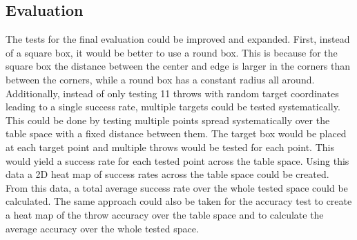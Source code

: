 \subsection{Evaluation}
The tests for the final evaluation could be improved and expanded. First, instead of a square box, it would be better to use a round box. This is because for the square box the distance between the center and edge is larger in the corners than between the corners, while a round box has a constant radius all around. Additionally, instead of only testing 11 throws with random target coordinates leading to a single success rate, multiple targets could be tested systematically. This could be done by testing multiple points spread systematically over the table space with a fixed distance between them. The target box would be placed at each target point and multiple throws would be tested for each point. This would yield a success rate for each tested point across the table space. Using this data a 2D heat map of success rates across the table space could be created. From this data, a total average success rate over the whole tested space could be calculated. The same approach could also be taken for the accuracy test to create a heat map of the throw accuracy over the table space and to calculate the average accuracy over the whole tested space. 
